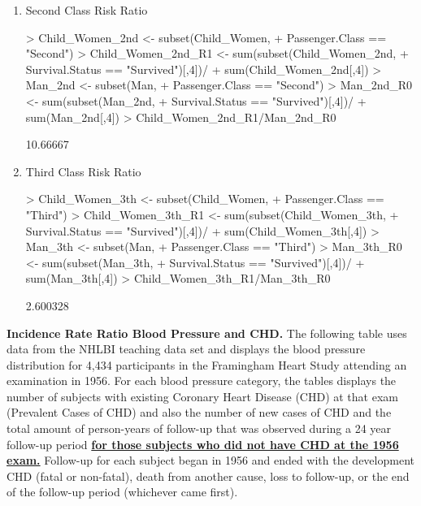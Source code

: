 \documentclass{article}
\begin{document}
\begin{enumerate}
\begin{enumerate}
  \item Second Class Risk Ratio
  
\begin{Schunk}
\begin{Sinput}
> Child_Women_2nd <- subset(Child_Women, 
+                           Passenger.Class == "Second")
> Child_Women_2nd_R1 <- sum(subset(Child_Women_2nd,
+                                  Survival.Status == "Survived")[,4])/
+                                    sum(Child_Women_2nd[,4])
> Man_2nd <- subset(Man, 
+                   Passenger.Class == "Second")
> Man_2nd_R0 <- sum(subset(Man_2nd, 
+                          Survival.Status == "Survived")[,4])/
+                            sum(Man_2nd[,4])
> Child_Women_2nd_R1/Man_2nd_R0
\end{Sinput}
\begin{Soutput}
[1] 10.66667
\end{Soutput}
\end{Schunk}
\pagebreak
\item Third Class Risk Ratio

\begin{Schunk}
\begin{Sinput}
> Child_Women_3th <- subset(Child_Women,
+                           Passenger.Class == "Third")
> Child_Women_3th_R1 <- sum(subset(Child_Women_3th, 
+                                  Survival.Status == "Survived")[,4])/
+                                    sum(Child_Women_3th[,4])
> Man_3th <- subset(Man, 
+                   Passenger.Class == "Third")
> Man_3th_R0 <- sum(subset(Man_3th, 
+                          Survival.Status == "Survived")[,4])/
+                            sum(Man_3th[,4])
> Child_Women_3th_R1/Man_3th_R0
\end{Sinput}
\begin{Soutput}
[1] 2.600328
\end{Soutput}
\end{Schunk}
\end{enumerate}
\end{enumerate}
\pagebreak

\textbf{Incidence Rate Ratio Blood Pressure and CHD.} The following table uses data from the NHLBI teaching data set and displays the blood pressure distribution for 4,434 participants in the Framingham Heart Study attending an examination in 1956. For each blood pressure category, the tables displays the number of subjects with existing Coronary Heart Disease (CHD) at that exam (Prevalent Cases of CHD) and also the number of new cases of CHD and the total amount of person-years of follow-up that was observed during a 24 year follow-up period \underline{\textbf{for those subjects who did not have CHD at the 1956 exam.}} Follow-up for each subject began in 1956 and ended with the development CHD (fatal or non-fatal), death from another cause, loss to follow-up, or the end of the follow-up period (whichever came first).
\end{document}

